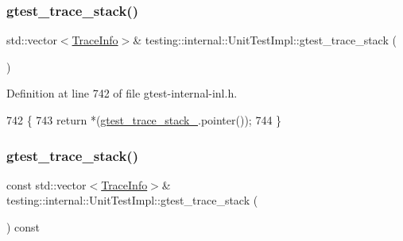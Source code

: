 \mbox{\label{classtesting_1_1internal_1_1UnitTestImpl_af8c7c0a0c954e36d83e6e4690d3fb938}} 
\subsubsection{\texorpdfstring{gtest\+\_\+trace\+\_\+stack()}{gtest\_trace\_stack()}\hspace{0.1cm}{\footnotesize\ttfamily [1/2]}}
{\footnotesize\ttfamily std\+::vector$<$\hyperlink{structtesting_1_1internal_1_1TraceInfo}{Trace\+Info}$>$\& testing\+::internal\+::\+Unit\+Test\+Impl\+::gtest\+\_\+trace\+\_\+stack (\begin{DoxyParamCaption}{ }\end{DoxyParamCaption})\hspace{0.3cm}{\ttfamily [inline]}}



Definition at line 742 of file gtest-\/internal-\/inl.\+h.


\begin{DoxyCode}
742                                             \{
743     \textcolor{keywordflow}{return} *(\hyperlink{classtesting_1_1internal_1_1UnitTestImpl_a73a797cf2b20129cb252b14c5fd9a0af}{gtest\_trace\_stack\_}.pointer());
744   \}
\end{DoxyCode}
\mbox{\label{classtesting_1_1internal_1_1UnitTestImpl_ad82fed50f13f13f11867af9dad4a2cf6}} 
\subsubsection{\texorpdfstring{gtest\+\_\+trace\+\_\+stack()}{gtest\_trace\_stack()}\hspace{0.1cm}{\footnotesize\ttfamily [2/2]}}
{\footnotesize\ttfamily const std\+::vector$<$\hyperlink{structtesting_1_1internal_1_1TraceInfo}{Trace\+Info}$>$\& testing\+::internal\+::\+Unit\+Test\+Impl\+::gtest\+\_\+trace\+\_\+stack (\begin{DoxyParamCaption}{ }\end{DoxyParamCaption}) const\hspace{0.3cm}{\ttfamily [inline]}}



